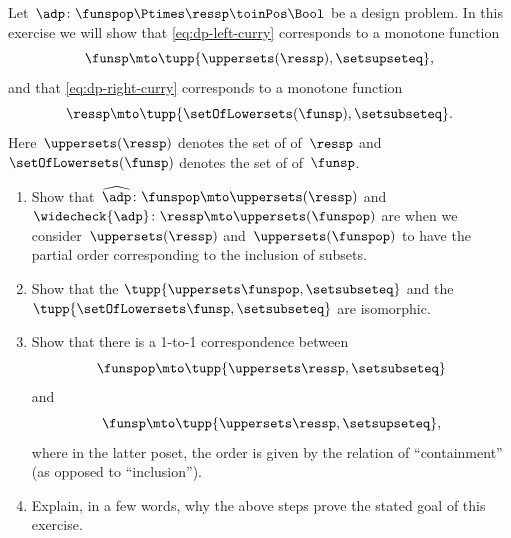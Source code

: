 \begin{gradedexercise}
    \label{ex:CurryingDesignProblems}
    Let~$\adp\colon \funspop \Ptimes \ressp\toinPos \Bool$ be a design problem.
    In this exercise we will show that \cref{eq:dp-left-curry} corresponds to a monotone function
    \begin{equation}
        \funsp \mto \tupp{\uppersets (\ressp), {{\setsupseteq}}},
    \end{equation}
    and that \cref{eq:dp-right-curry} corresponds to a monotone function
    \begin{equation}
        \ressp \mto \tupp{\setOfLowersets(\funsp), \setsubseteq}.
    \end{equation}
    Here~$\uppersets (\ressp)$ denotes the set of  of~$\ressp$ and~$\setOfLowersets(\funsp)$ denotes the set of  of~$\funsp$.

    \begin{enumerate}
        \item Show that~$\widehat{\adp} \colon \funspop \mto \uppersets (\ressp)$ and~$\widecheck{\adp} \colon \ressp \mto \uppersets (\funspop)$ are  when we consider~$\uppersets (\ressp)$ and~$\uppersets (\funspop)$ to have the partial order corresponding to the inclusion of subsets.
        \item Show that the  $\tupp{\uppersets\funspop,\setsubseteq}$ and the  $\tupp{\setOfLowersets\funsp, \setsubseteq}$ are isomorphic.
        \item Show that there is a 1-to-1 correspondence between   \begin{equation}
                  \funspop \mto \tupp{\uppersets \ressp, \setsubseteq}
              \end{equation}
              and   \begin{equation}
                  \funsp \mto \tupp{\uppersets \ressp, {{\setsupseteq}}},
              \end{equation}
              where in the latter poset, the order is given by the relation of ``containment'' (as opposed to ``inclusion'').
        \item Explain, in a few words, why the above steps prove the stated goal of this exercise.
    \end{enumerate}
\end{gradedexercise}


